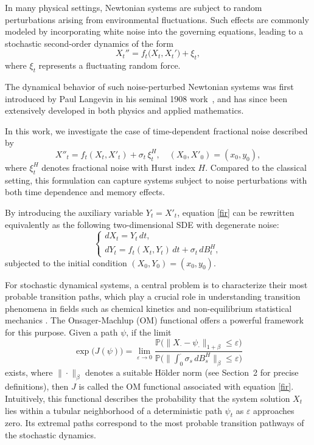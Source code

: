 \documentclass{article}
\theoremstyle{definition}  %
\theoremstyle{plain}  %
\begin{document}
In many physical settings, Newtonian systems are subject to random perturbations arising from environmental fluctuations. Such effects are commonly modeled by incorporating white noise into the governing equations, leading to a stochastic second-order dynamics of the form
\[
X_t'' = f_t\bigl(X_t, X_t'\bigr) +  \xi_t,
\]
where $\xi_t$ represents a fluctuating random force.

The dynamical behavior of such noise-perturbed Newtonian systems was first introduced by Paul Langevin in his seminal 1908 work~\cite{Langevin1908}, and has since been extensively developed in both physics and applied mathematics.


In this work, we investigate the case of time-dependent fractional noise described by
\begin{equation}
    X''_t = f_t(X_t, X'_t) + \sigma_t \, \xi^H_t, \quad (X_0, X'_0) = (x_0, y_0), \label{fir}
\end{equation}
where \(\xi^H_t\) denotes fractional noise with Hurst index \(H\). Compared to the classical setting, this formulation can capture systems subject to noise perturbations with both time dependence and memory effects.

By introducing the auxiliary variable \(Y_t = X'_t\), equation \eqref{fir} can be rewritten equivalently as the following two-dimensional SDE with degenerate noise:
\begin{equation}
\label{sec}
\begin{cases}
dX_t = Y_t \, dt, \\[4pt]
dY_t = f_t(X_t, Y_t) \, dt + \sigma_t \, dB^H_t,
\end{cases}
\end{equation}
subjected to the initial condition \((X_0, Y_0) = (x_0, y_0)\).

For stochastic dynamical systems, a central problem is to characterize their most probable transition paths, which play a crucial role in understanding transition phenomena in fields such as chemical kinetics and non-equilibrium statistical mechanics \cite{VandenEijnden2010}. The Onsager-Machlup (OM) functional offers a powerful framework for this purpose. Given a path \(\psi\), if the limit
\begin{equation}
\label{omf}
    \exp\bigl(J(\psi)\bigr) = \lim_{\varepsilon \to 0} 
    \frac{\mathbb{P}\bigl(\| X_{\cdot} - \psi_{\cdot} \|_{1+\beta} \leq \varepsilon\bigr)}
         {\mathbb{P}\bigl(\| \textstyle\int_0^{\cdot} \sigma_s \, dB^H_s \|_\beta \leq \varepsilon\bigr)}
\end{equation}
exists, where \(\|\cdot\|_{\beta}\) denotes a suitable Hölder norm (see Section~2 for precise definitions), then \(J\) is called the OM functional associated with equation \eqref{fir}. Intuitively, this functional describes the probability that the system solution \(X_t\) lies within a tubular neighborhood of a deterministic path \(\psi_t\) as \(\varepsilon\) approaches zero. Its extremal paths correspond to the most probable transition pathways of the stochastic dynamics.
\end{document}
